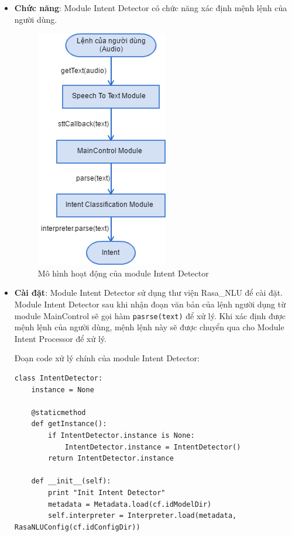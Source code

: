 \begin{itemize}
\item \textbf{Chức năng}: Module Intent Detector có chức năng xác định mệnh lệnh của người dùng.

\begin{figure}[h]
    \centering
    \includegraphics[scale=0.6]{intent_classification_flowchart}
    \caption{Mô hình hoạt động của module Intent Detector}
    \label{fig:c6_intent_classification_flowchart}
\end{figure}

\item \textbf{Cài đặt}: Module Intent Detector sử dụng thư viện Rasa\_NLU để cài đặt. Module Intent Detector sau khi nhận đoạn văn bản của lệnh người dụng từ module MainControl sẽ gọi hàm \lstinline{pasrse(text)} để xử lý. Khi xác định được mệnh lệnh của người dùng, mệnh lệnh này sẽ được chuyển qua cho Module Intent Processor để xử lý.

Đoạn code xử lý chính của module Intent Detector:
\begin{lstlisting}
class IntentDetector:
    instance = None

    @staticmethod
    def getInstance():
        if IntentDetector.instance is None:
            IntentDetector.instance = IntentDetector()
        return IntentDetector.instance

    def __init__(self):
        print "Init Intent Detector"
        metadata = Metadata.load(cf.idModelDir)
        self.interpreter = Interpreter.load(metadata, RasaNLUConfig(cf.idConfigDir))


\end{lstlisting}
\end{itemize}
